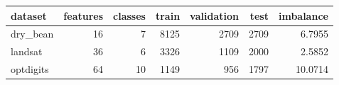 \begin{tabular}{lrrrrrr}
\toprule
dataset & features & classes & train & validation & test & imbalance \\
\midrule
dry\_bean & 16 & 7 & 8125 & 2709 & 2709 & 6.7955 \\
landsat & 36 & 6 & 3326 & 1109 & 2000 & 2.5852 \\
optdigits & 64 & 10 & 1149 & 956 & 1797 & 10.0714 \\
\bottomrule
\end{tabular}
